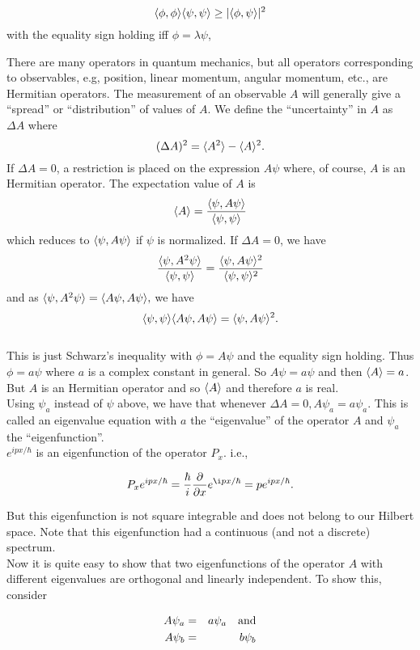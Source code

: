 \[ \langle \phi,\phi\rangle\langle \psi,\psi\rangle \ge |\langle \phi,\psi\rangle|^2 \] with the equality sign holding iff $\phi = \lambda \psi$,

There are many operators in quantum mechanics, but all operators corresponding to observables, e.g, position, linear momentum, 
angular momentum, etc., are Hermitian operators. The measurement of an observable $A$ will generally give a ``spread'' or ``distribution''
of values of $A$. We define the ``uncertainty'' in $A$ as $\Delta A$ where 
\[ (\Delta A)^2 = \langle A^2\rangle - \langle A\rangle^2. \]
If $\Delta A = 0$, a restriction is placed on the expression $A\psi$ where, of course, $A$ is an Hermitian operator. The expectation 
value of $A$ is \[ \langle A\rangle = { \langle \psi,A\psi\rangle\over \langle \psi,\psi\rangle}\] which reduces to $\langle \psi, A\psi\rangle$ if $\psi$ is normalized.
If $\Delta A = 0$, we have 
\[ { \langle \psi, A^2 \psi\rangle \over \langle \psi,\psi\rangle} = { \langle \psi,A\psi\rangle^2\over \langle \psi,\psi\rangle^2} \] and as 
$\langle \psi,A^2 \psi \rangle = \langle A\psi,A\psi\rangle,$ we have 
\[ \langle \psi,\psi\rangle\langle A\psi,A\psi\rangle = \langle \psi,A\psi\rangle^2. \] \\

This is just Schwarz's inequality with $\phi = A\psi$ and the equality sign holding. Thus $\phi = a\psi$ where $a$ is a complex constant
in general. So $A \psi = a\psi$ and then $\langle A\rangle = a$. But $A$ is an Hermitian operator and so $\langle A\rangle$ and therefore $a$ is real.\\

Using $\psi_a$ instead of $\psi$ above, we have that whenever $\Delta A = 0, A\psi_a = a \psi_a$. This is called an eigenvalue equation
with $a$ the ``eigenvalue'' of the operator $A$ and $\psi_a$ the ``eigenfunction''.\\

$e^{ {ipx / \hbar}}$ is an eigenfunction of the operator $P_x$. i.e., 

\[ P_x e^{ipx/\hbar} = {\hbar\over i} {\partial \over \partial x} e^{\i px/\hbar} = p e^{ipx/\hbar}.\]

But this eigenfunction is not square integrable and does not belong to our Hilbert space. Note that this eigenfunction had a continuous (and not
a discrete) spectrum.\\

Now it is quite easy to show that two eigenfunctions of the operator $A$ with different eigenvalues are orthogonal and linearly independent. To 
show this, consider 

\begin{eqnarray*}
A \psi_a&=&a \psi_a \quad \hbox{and} \\
A \psi_b&=&b \psi_b\\
\end{eqnarray*} 

